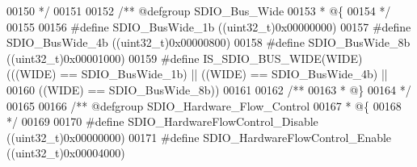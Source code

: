 \begin{DoxyCode}
00150 \textcolor{comment}{  */}
00151 
00152 \textcolor{comment}{/** @defgroup SDIO\_Bus\_Wide }
00153 \textcolor{comment}{  * @\{}
00154 \textcolor{comment}{  */}
00155 
00156 \textcolor{preprocessor}{#}\textcolor{preprocessor}{define} \textcolor{preprocessor}{SDIO\_BusWide\_1b}                     \textcolor{preprocessor}{(}\textcolor{preprocessor}{(}\textcolor{preprocessor}{uint32\_t}\textcolor{preprocessor}{)}0x00000000\textcolor{preprocessor}{)}
00157 \textcolor{preprocessor}{#}\textcolor{preprocessor}{define} \textcolor{preprocessor}{SDIO\_BusWide\_4b}                     \textcolor{preprocessor}{(}\textcolor{preprocessor}{(}\textcolor{preprocessor}{uint32\_t}\textcolor{preprocessor}{)}0x00000800\textcolor{preprocessor}{)}
00158 \textcolor{preprocessor}{#}\textcolor{preprocessor}{define} \textcolor{preprocessor}{SDIO\_BusWide\_8b}                     \textcolor{preprocessor}{(}\textcolor{preprocessor}{(}\textcolor{preprocessor}{uint32\_t}\textcolor{preprocessor}{)}0x00001000\textcolor{preprocessor}{)}
00159 \textcolor{preprocessor}{#}\textcolor{preprocessor}{define} \textcolor{preprocessor}{IS\_SDIO\_BUS\_WIDE}\textcolor{preprocessor}{(}\textcolor{preprocessor}{WIDE}\textcolor{preprocessor}{)} \textcolor{preprocessor}{(}\textcolor{preprocessor}{(}\textcolor{preprocessor}{(}\textcolor{preprocessor}{WIDE}\textcolor{preprocessor}{)} \textcolor{preprocessor}{==} SDIO_BusWide_1b\textcolor{preprocessor}{)} \textcolor{preprocessor}{||} \textcolor{preprocessor}{(}\textcolor{preprocessor}{(}\textcolor{preprocessor}{WIDE}\textcolor{preprocessor}{)} \textcolor{preprocessor}{==} 
      SDIO_BusWide_4b\textcolor{preprocessor}{)} \textcolor{preprocessor}{||}
00160                                 \textcolor{preprocessor}{(}\textcolor{preprocessor}{(}\textcolor{preprocessor}{WIDE}\textcolor{preprocessor}{)} \textcolor{preprocessor}{==} SDIO_BusWide_8b\textcolor{preprocessor}{)}\textcolor{preprocessor}{)}
00161 
00162 \textcolor{comment}{/**}
00163 \textcolor{comment}{  * @\}}
00164 \textcolor{comment}{  */}
00165 
00166 \textcolor{comment}{/** @defgroup SDIO\_Hardware\_Flow\_Control }
00167 \textcolor{comment}{  * @\{}
00168 \textcolor{comment}{  */}
00169 
00170 \textcolor{preprocessor}{#}\textcolor{preprocessor}{define} \textcolor{preprocessor}{SDIO\_HardwareFlowControl\_Disable}    \textcolor{preprocessor}{(}\textcolor{preprocessor}{(}\textcolor{preprocessor}{uint32\_t}\textcolor{preprocessor}{)}0x00000000\textcolor{preprocessor}{)}
00171 \textcolor{preprocessor}{#}\textcolor{preprocessor}{define} \textcolor{preprocessor}{SDIO\_HardwareFlowControl\_Enable}     \textcolor{preprocessor}{(}\textcolor{preprocessor}{(}\textcolor{preprocessor}{uint32\_t}\textcolor{preprocessor}{)}0x00004000\textcolor{preprocessor}{)}

\end{DoxyCode}
